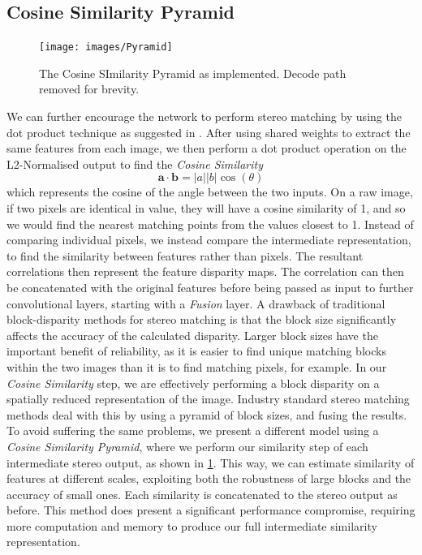 \documentclass[ %
                    author={Gavin Parker},
                supervisor={Dr. Neill Campbell},
                    degree={MEng},
                     title={Deep Learning for Illumination Estimation from Stereo Images},
                  subtitle={},
                      type={Research},
                      year={2018} ]{dissertation}
\begin{document}
\subsection{Cosine Similarity Pyramid}
\begin{figure}[H]
\label{fig:pyramid}
\centering
\texttt{[image: images/Pyramid]}
\caption{The Cosine SImilarity Pyramid as implemented. Decode path removed for brevity.}
\end{figure}
We can further encourage the network to perform stereo matching by using the dot product technique as suggested in \cite{7780983}. After using shared weights to extract the same features from each image, we then perform a dot product operation on the L2-Normalised output to find the \textit{Cosine Similarity}
\[\bm{a}\cdot \bm{b} = \lvert a \rvert \lvert b\rvert \cos(\theta) \]
which represents the cosine of the angle between the two inputs. On a raw image, if two pixels are identical in value, they will have a cosine similarity of 1, and so we would find the nearest matching points from the values closest to 1. Instead of comparing individual pixels, we instead compare the intermediate representation, to find the similarity between features rather than pixels. The resultant correlations then represent the feature disparity maps. The correlation can then be concatenated with the original features before being passed as input to further convolutional layers, starting with a \textit{Fusion} layer.
\newline
A drawback of traditional block-disparity methods for stereo matching is that the block size significantly affects the accuracy of the calculated disparity. Larger block sizes have the important benefit of reliability, as it is easier to find unique matching blocks within the two images than it is to find matching pixels, for example. In our \textit{Cosine Similarity} step, we are effectively performing a block disparity on a spatially reduced representation of the image. Industry standard stereo matching methods deal with this by using a pyramid of block sizes, and fusing the results. To avoid suffering the same problems, we present a different model using a \textit{Cosine Similarity Pyramid}, where we perform our similarity step of each intermediate stereo output, as shown in \ref{fig:pyramid}. This way, we can estimate similarity of features at different scales, exploiting both the robustness of large blocks and the accuracy of small ones. Each similarity is concatenated to the stereo output as before. This method does present a significant performance compromise, requiring more computation and memory to produce our full intermediate similarity representation.
\end{document}
